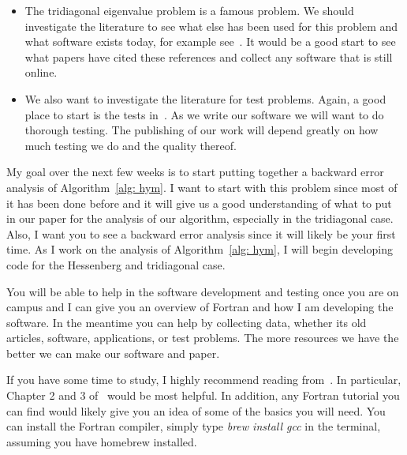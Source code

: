 \documentclass{article}
\begin{document}
\begin{itemize}
\item	The tridiagonal eigenvalue problem is a famous problem.
	We should investigate the literature to see what else has been used for this problem and what software exists today, for example see~\cite{Bini2005,Plestenjak2006}. 
	It would be a good start to see what papers have cited these references and collect any software that is still online.
\item	We also want to investigate the literature for test problems. 
	Again, a good place to start is the tests in~\cite{Bini2005,Plestenjak2006}. 
	As we write our software we will want to do thorough testing. 
	The publishing of our work will depend greatly on how much testing we do and the quality thereof.
\end{itemize}

My goal over the next few weeks is to start putting together a backward error analysis of Algorithm~\ref{alg: hym}. 
I want to start with this problem since most of it has been done before and it will give us a good understanding of what to put in our paper for the analysis of our algorithm, especially in the tridiagonal case.
Also, I want you to see a backward error analysis since it will likely be your first time. 
As I work on the analysis of Algorithm~\ref{alg: hym}, I will begin developing code for the Hessenberg and tridiagonal case. 

You will be able to help in the software development and testing once you are on campus and I can give you an overview of Fortran and how I am developing the software.
In the meantime you can help by collecting data, whether its old articles, software, applications, or test problems. 
The more resources we have the better we can make our software and paper. 

If you have some time to study, I highly recommend reading from~\cite{Higham2002}.
In particular, Chapter 2 and 3 of~\cite{Higham2002} would be most helpful. 
In addition, any Fortran tutorial you can find would likely give you an idea of some of the basics you will need.
You can install the Fortran compiler, simply type \emph{brew install gcc} in the terminal, assuming you have homebrew installed. 

\label{Bibliography}


\end{document}
